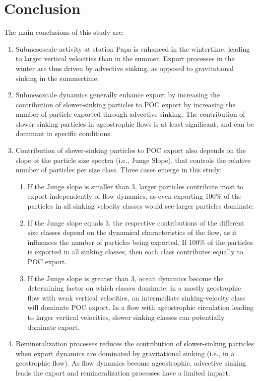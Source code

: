 \documentclass[draft,linenumbers]{agujournal2018}
\begin{document}
\section{Conclusion}
\label{sec: Conclusions}
The main conclusions of this study are: 
\begin{enumerate}
\item Submesoscale activity at station Papa is enhanced in the wintertime, leading to larger vertical velocities than in the summer. Export processes in the winter are thus driven by advective sinking, as opposed to gravitational sinking in the summertime.
\item Submesoscale dynamics generally enhance export by increasing the contribution of slower-sinking particles to POC export by increasing the number of particle exported through advective sinking. The contribution of slower-sinking particles in ageostrophic flows is at least significant, and can be dominant in specific conditions.
\item Contribution of slower-sinking particles to POC export also depends on the slope of the particle size spectra (i.e., Junge Slope), that controls the relative number of particles per size class. Three cases emerge in this study:
\begin{enumerate}
	\item If the Junge slope is smaller than 3, larger particles contribute most to export independently of flow dynamics, as even exporting 100\% of the particles in all sinking velocity classes would see larger particles dominate. 
	\item If the Junge slope equals 3, the respective contributions of the different size classes depend on the dynamical characteristics of the flow, as it influences the number of particles being exported. If 100\% of the particles is exported in all sinking classes, then each class contributes equally to POC export.
	\item If the Junge slope is greater than 3, ocean dynamics become the determining factor on which classes dominate: in a mostly geostrophic flow with weak vertical velocities, an intermediate sinking-velocity class will dominate POC export. In a flow with ageostrophic circulation leading to larger vertical velocities, slower sinking classes can potentially dominate export.
	\end{enumerate}
\item Remineralization processes reduces the contribution of slower-sinking particles when export dynamics are dominated by gravitational sinking (i.e., in a geostrophic flow). As flow dynamics become ageostrophic, advective sinking leads the export and remineralization processes have a limited impact.
\end{enumerate}
\end{document}
